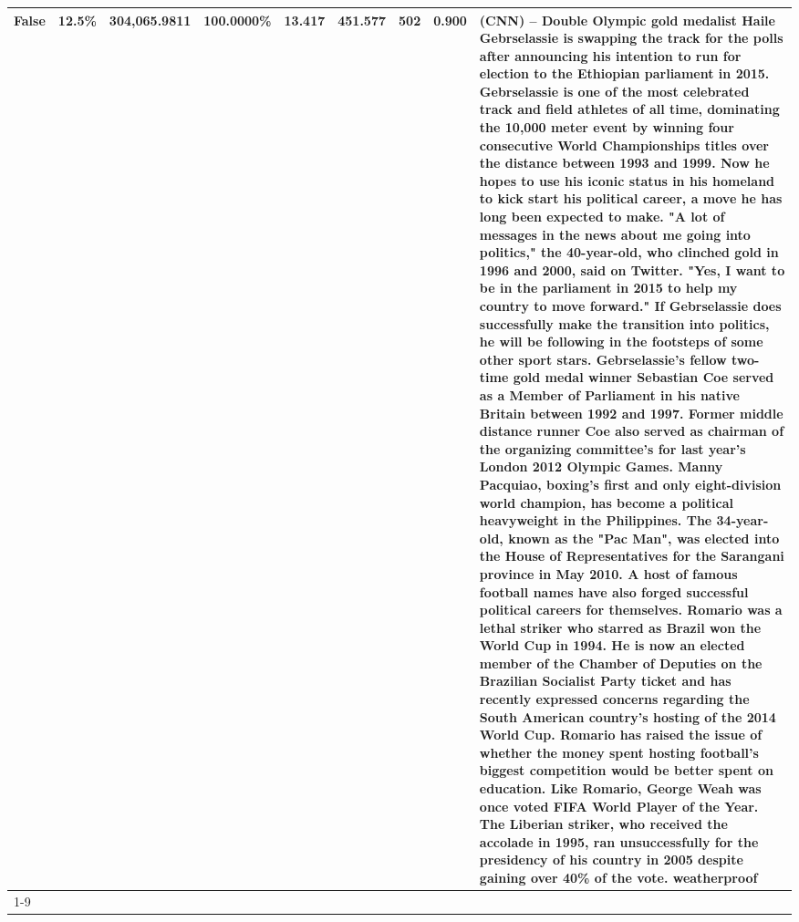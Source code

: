 \begin{table}[H]
{\begin{tabular}{lllrlllll}
False & 12.5\% & 304,065.9811 & \bfseries \color{red} 100.0000\% & 13.417 & 451.577 & 502 & 0.900 & (CNN) -- Double Olympic gold medalist Haile Gebrselassie is swapping the track for the polls after announcing his intention to run for election to the Ethiopian parliament in 2015. Gebrselassie is one of the most celebrated track and field athletes of all time, dominating the 10,000 meter event by winning four consecutive World Championships titles over the distance between 1993 and 1999. Now he hopes to use his iconic status in his homeland to kick start his political career, a move he has long been expected to make. "A lot of messages in the news about me going into politics," the 40-year-old, who clinched gold in 1996 and 2000, said on Twitter. "Yes, I want to be in the parliament in 2015 to help my country to move forward." If Gebrselassie does successfully make the transition into politics, he will be following in the footsteps of some other sport stars. Gebrselassie's fellow two-time gold medal winner Sebastian Coe served as a Member of Parliament in his native Britain between 1992 and 1997. Former middle distance runner Coe also served as chairman of the organizing committee's for last year's London 2012 Olympic Games. Manny Pacquiao, boxing's first and only eight-division world champion, has become a political heavyweight in the Philippines. The 34-year-old, known as the "Pac Man", was elected into the House of Representatives for the Sarangani province in May 2010. A host of famous football names have also forged successful political careers for themselves. Romario was a lethal striker who starred as Brazil won the World Cup in 1994. He is now an elected member of the Chamber of Deputies on the Brazilian Socialist Party ticket and has recently expressed concerns regarding the South American country's hosting of the 2014 World Cup. Romario has raised the issue of whether the money spent hosting football's biggest competition would be better spent on education. Like Romario, George Weah was once voted FIFA World Player of the Year. The Liberian striker, who received the accolade in 1995, ran unsuccessfully for the presidency of his country in 2005 despite gaining over 40\% of the vote. weatherproof \\
\cline{1-9}

\end{tabular}}
\end{table}
